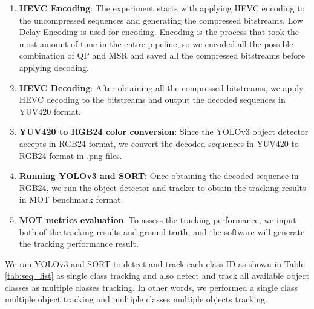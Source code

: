 \begin{enumerate}
    \item \textbf{HEVC Encoding}: The experiment starts with applying HEVC encoding to the uncompressed sequences and generating the compressed bitstreams. Low Delay Encoding is used for encoding. Encoding is the process that took the most amount of time in the entire pipeline, so we encoded all the possible combination of QP and MSR and saved all the compressed bitstreams before applying decoding.
    \item \textbf{HEVC Decoding}: After obtaining all the compressed bitstreams, we apply HEVC decoding to the bitstreams and output the decoded sequences in YUV420 format.
    \item \textbf{YUV420 to RGB24 color conversion}: Since the YOLOv3 object detector accepts in RGB24 format, we convert the decoded sequences in YUV420 to RGB24 format in .png files.
    \item \textbf{Running YOLOv3 and SORT}: Once obtaining the decoded sequence in RGB24, we run the object detector and tracker to obtain the tracking results in MOT benchmark format. 
    \item \textbf{MOT metrics evaluation}: To assess the tracking performance, we input both of the tracking results and ground truth, and the software \cite{heindl_cheindpy-motmetrics_2021} will generate the tracking performance result.
\end{enumerate}
We ran YOLOv3 and SORT to detect and track each class ID as shown in Table \ref{tab:seq_list} as single class tracking and also detect and track all available object classes as multiple classes tracking. In other words, we performed a single class multiple object tracking and multiple classes multiple objects tracking.

